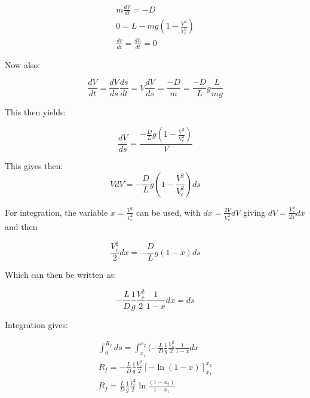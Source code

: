 \begin{equation}
    \begin{split}
        m \frac{dV}{dt} = -D \\
        0= L - mg (1-\frac{V^2}{V_e^2}) \\
        \frac{dr}{dt} = \frac{dh}{dt} = 0
    \end{split}
\end{equation}


Now also:

\begin{equation}
    \frac{dV}{dt} = \frac{dV}{ds}\frac{ds}{dt} = V \frac{dV}{ds} = \frac{-D}{m} = \frac{-D}{L} g \frac{L}{mg}
\end{equation}

This then yields:

\begin{equation}
    \frac{dV}{ds} = \frac{- \frac{D}{L}g (1-\frac{V^2}{V_c^2})}{V}
\end{equation}

This gives then:
\begin{equation}
    V dV = - \frac{D}{L}g (1-\frac{V^2}{V_c^2})ds
\end{equation}

For integration, the variable $x = \frac{V^2}{V_c^2}$ can be used, with $dx =\frac{2V}{V_c^2}dV$ giving $dV = \frac{V_c^2}{2V} dx$ and then 

\begin{equation}
    \frac{V_c^2}{2} dx = - \frac{D}{L}g (1-x)ds
\end{equation}

Which can then be written as:

\begin{equation}
     -\frac{L}{D} \frac{1}{g}  \frac{V_c^2}{2} \frac{1}{1-x} dx = ds
\end{equation}

Integration gives:

\begin{equation}
\begin{split}
     \int_{0}^{R_f} ds = \int_{x_1}^{x_2} (-\frac{L}{D} \frac{1}{g}  \frac{V_c^2}{2} \frac{1}{1-x} dx \\
     R_f =  -\frac{L}{D} \frac{1}{g}  \frac{V_c^2}{2} [-\ln{(1-x)}]_{x_1}^{x_2} \\
     R_f =  \frac{L}{D} \frac{1}{g}  \frac{V_c^2}{2} \ln{\frac{(1-x_2)}{1-x_1}} \\
\end{split}     
\end{equation}

